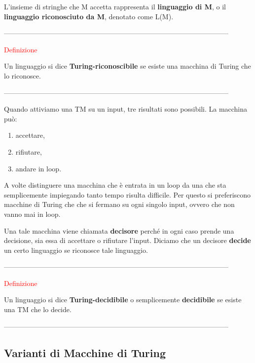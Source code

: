 \documentclass{article}
\begin{document}
L'insieme di stringhe che M accetta rappresenta il \textbf{linguaggio di M}, o
il \textbf{linguaggio riconosciuto da M}, denotato come L(M).

--------------------------------------------------------------------------------------------------

\begin{center}
    \textcolor{red}{Definizione}
\end{center}

Un linguaggio si dice \textbf{Turing-riconoscibile} se esiste una macchina di
Turing che lo riconosce.

--------------------------------------------------------------------------------------------------

Quando attiviamo una TM su un input, tre risultati sono possibili. La macchina
può:

\begin{enumerate}
    \item accettare,
    \item rifiutare,
    \item andare in loop.
\end{enumerate}

A volte distinguere una macchina che è entrata in un loop da una che sta
semplicemente impiegando tanto tempo risulta difficile. Per questo si
preferiscono macchine di Turing che che si fermano su ogni singolo input, ovvero
che non vanno mai in loop. 

Una tale macchina viene chiamata \textbf{decisore} perché in ogni caso prende
una decisione, sia essa di accettare o rifiutare l'input. Diciamo che un
decisore \textbf{decide} un certo linguaggio se riconosce tale linguaggio.

--------------------------------------------------------------------------------------------------

\begin{center}
    \textcolor{red}{Definizione}
\end{center}

Un linguaggio si dice \textbf{Turing-decidibile} o semplicemente
\textbf{decidibile} se esiste una TM che lo decide.

--------------------------------------------------------------------------------------------------

\subsection{Varianti di Macchine di Turing}
\end{document}
